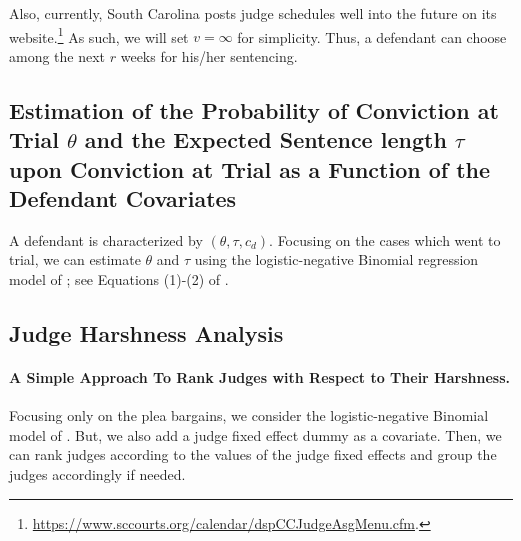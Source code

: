 \documentclass[11pt, oneside]{article}   	%
\theoremstyle{ModifiedStyle}
\begin{document}
	Also, currently, South Carolina posts judge schedules well into the future on its website.\footnote{\url{https://www.sccourts.org/calendar/dspCCJudgeAsgMenu.cfm}.} As such, we will set $v=\infty$ for simplicity. Thus, a defendant can choose among the next $r$ weeks for his/her sentencing.

	\subsection{Estimation of the Probability of Conviction at Trial $\theta$ and the Expected Sentence length $\tau$ upon Conviction at Trial as a Function of the Defendant Covariates}
		\label{Sec:Estimation:Probability_Of_Conviction_And_Sentence_Length}
		A defendant is characterized by $(\theta,\tau,c_d)$. Focusing on the cases which went to trial, we can estimate $\theta$ and $\tau$ using the logistic-negative Binomial regression model of \citet{Hester_Hartman_2017}; see Equations (1)-(2) of \citet{Hester_Hartman_2017}.

	\subsection{Judge Harshness Analysis}
		\label{Sec:Judge_Harshness_Analysis}

		\vspace{-3mm}
		\paragraph{A Simple Approach To Rank Judges with Respect to Their Harshness.} Focusing only on the plea bargains, we consider the logistic-negative Binomial model of \citet{Hester_Hartman_2017}. But, we also add a judge fixed effect dummy as a covariate. Then, we can rank judges according to the values of the judge fixed effects and group the judges accordingly if needed.
		\vspace{-3mm}
\end{document}
